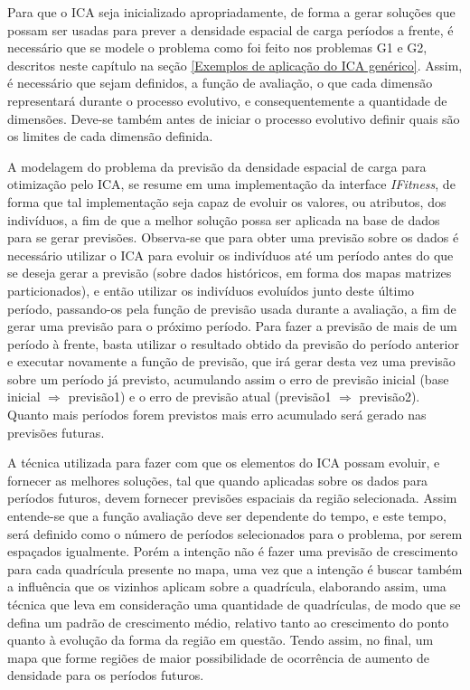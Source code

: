 Para que o ICA seja inicializado apropriadamente, de forma a gerar soluções que possam ser usadas para prever a densidade espacial de carga períodos a frente, é necessário que se modele o problema como foi feito nos problemas G1 e G2, descritos neste capítulo na seção \ref{Exemplos de aplicação do ICA genérico}. Assim, é necessário que sejam definidos, a função de avaliação, o que cada dimensão representará durante o processo evolutivo, e consequentemente a quantidade de dimensões. Deve-se também antes de iniciar o processo evolutivo definir quais são os limites de cada dimensão definida.

A modelagem do problema da previsão da densidade espacial de carga para otimização pelo ICA, se resume em uma implementação da interface \emph{IFitness}, de forma que tal implementação seja capaz de evoluir os valores, ou atributos, dos indivíduos, a fim de que a melhor solução possa ser aplicada na base de dados para se gerar previsões. Observa-se que para obter uma previsão sobre os dados é necessário utilizar o ICA para evoluir os indivíduos até um período antes do que se deseja gerar a previsão (sobre dados históricos, em forma dos mapas matrizes particionados), e então utilizar os indivíduos evoluídos junto deste último período, passando-os pela função de previsão usada durante a avaliação, a fim de gerar uma previsão para o próximo período. Para fazer a previsão de mais de um período à frente, basta utilizar o resultado obtido da previsão do período anterior e executar novamente a função de previsão, que irá gerar desta vez uma previsão sobre um período já previsto, acumulando assim o erro de previsão inicial (base inicial \(\Rightarrow\) previsão1) e o erro de previsão atual (previsão1 \(\Rightarrow\) previsão2). Quanto mais períodos forem previstos mais erro acumulado será gerado nas previsões futuras.

A técnica utilizada para fazer com que os elementos do ICA possam evoluir, e fornecer as melhores soluções, tal que quando aplicadas sobre os dados para períodos futuros, devem fornecer previsões espaciais da região selecionada. Assim  entende-se que a função avaliação deve ser dependente do tempo, e este tempo, será definido como o número de períodos selecionados para o problema, por serem espaçados igualmente. Porém a intenção não é fazer uma previsão de crescimento para cada quadrícula presente no mapa, uma vez que a intenção é buscar também a influência que os vizinhos aplicam sobre a quadrícula, elaborando assim, uma técnica que leva em consideração uma quantidade de quadrículas, de modo que se defina um padrão de crescimento médio, relativo tanto ao crescimento do ponto quanto à evolução da forma da região em questão. Tendo assim, no final, um mapa que forme regiões de maior possibilidade de ocorrência de aumento de densidade para os períodos futuros.

